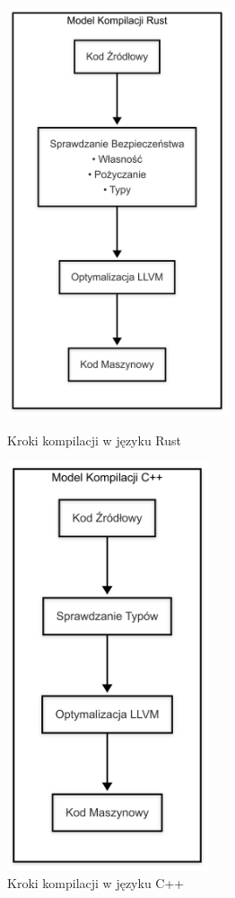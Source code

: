 \begin{figure}[H]
    \centering
    \begin{minipage}{.5\textwidth}
        \centering
        \includegraphics[height=12cm]{images/RustBuildsSteps.png}
        \caption{Kroki kompilacji w języku Rust}
        \label{fig:rust_build_steps}
    \end{minipage}%
    \begin{minipage}{.5\textwidth}
        \centering
        \includegraphics[height=12cm]{images/CppBuildsSteps.png}
        \caption{Kroki kompilacji w języku C++}
        \label{fig:cpp_build_steps}
    \end{minipage}
\end{figure}

